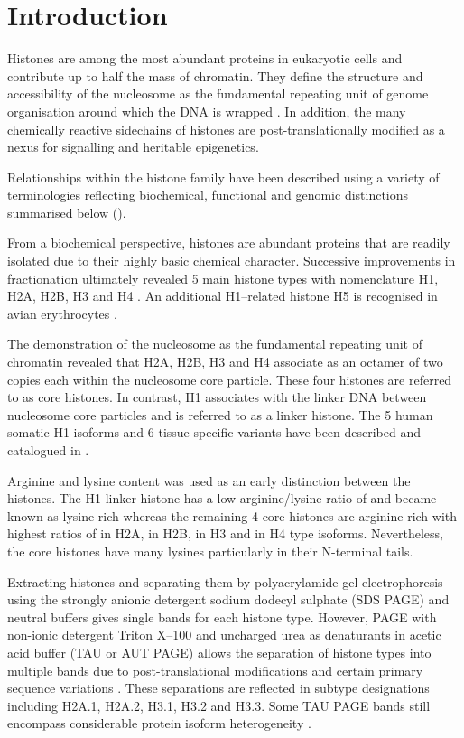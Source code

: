 \section{Introduction}

  Histones are among the most abundant proteins in eukaryotic cells and contribute up to half the mass of chromatin. 
  They define the structure and accessibility of the nucleosome as the fundamental repeating unit of genome organisation 
  around which the DNA is wrapped .
  In addition, the many chemically reactive sidechains of histones are post-translationally modified 
  as a nexus for signalling and heritable epigenetics. 

  Relationships within the histone family have been described using a variety of terminologies
  reflecting biochemical, functional and genomic distinctions summarised below ().
  
  From a biochemical perspective, histones are abundant proteins 
  that are readily isolated due to their highly basic chemical character. 
  Successive improvements in fractionation ultimately revealed 5 main histone types 
  with nomenclature H1, H2A, H2B, H3 and H4 \citep{nomenclature}.
  An additional H1--related histone H5 is recognised in avian erythrocytes \citep{HFive-review}.

  The demonstration of the nucleosome as the fundamental repeating unit of chromatin  
  revealed that H2A, H2B, H3 and H4 associate as an octamer of two copies each within the
  nucleosome core particle. These four histones are referred to as core histones. 
  In contrast, H1 associates with the linker DNA between nucleosome core particles 
  and is referred to as a linker histone. 
  The 5 human somatic H1 isoforms and 6 tissue-specific variants have been described and catalogued in .

  Arginine and lysine content was used as an early distinction between the histones. 
  The H1 linker histone has a low arginine/lysine ratio of \LinkerArgLysRatio{} and became known as lysine-rich 
  whereas the remaining 4 core histones are arginine-rich 
  with highest ratios of \HTwoAArgLysRatio{} in H2A,  \HTwoBArgLysRatio{} in H2B, 
  \HThreeArgLysRatio{} in H3 and \HFourArgLysRatio{} in H4 type isoforms.
  Nevertheless, the core histones have many lysines particularly in their N-terminal tails.

  Extracting histones and separating them by polyacrylamide gel electrophoresis 
  using the strongly anionic detergent sodium dodecyl sulphate (SDS PAGE) and neutral buffers 
  gives single bands for each histone type. 
  However, PAGE with non-ionic detergent Triton X--100 and uncharged urea as denaturants
  in acetic acid buffer (TAU or AUT PAGE) allows the separation of histone types into multiple bands 
  due to post-translational modifications and certain primary sequence variations \citep{PAGEND}. 
  These separations are reflected in subtype designations including H2A.1, H2A.2, H3.1, H3.2 and H3.3. 
  Some TAU PAGE bands still encompass considerable protein isoform heterogeneity \addref{}.

